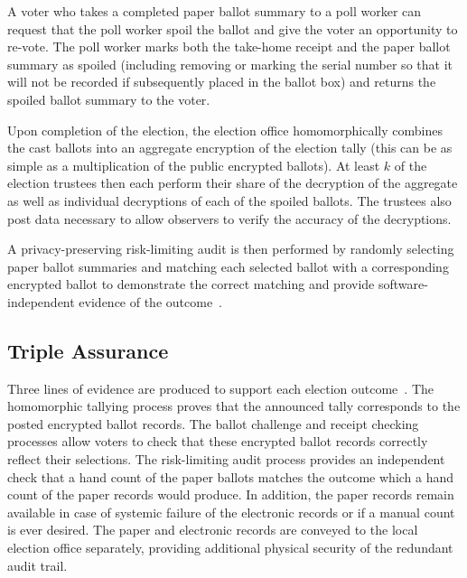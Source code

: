 A voter who takes a completed paper ballot summary to a poll worker can request that the poll worker spoil the ballot and give the voter an opportunity to re-vote.  
The poll worker marks both the take-home receipt and the paper ballot summary as spoiled (including removing or marking the serial number so that it will not be recorded if subsequently placed in the ballot box) and returns the spoiled ballot summary to the voter.

Upon completion of the election, the election office homomorphically combines the cast ballots into an aggregate encryption of the election tally (this can be as simple as a multiplication of the public encrypted ballots).  At least $k$ of the election trustees then each perform their share of the decryption of the aggregate as well as individual decryptions of each of the spoiled ballots.  The trustees also post data necessary to allow observers to verify the accuracy of the decryptions.

A privacy-preserving risk-limiting audit is then performed by randomly selecting paper ballot summaries and matching each selected ballot with a corresponding encrypted ballot to demonstrate the correct matching and provide software-independent evidence of the outcome~\cite{rivest06sivoting,lindemanStark12,starkWagner12}.

\subsection{Triple Assurance}

Three lines of evidence are produced to support each election outcome~\cite{starkWagner12}.  The homomorphic tallying process proves that the announced tally corresponds to the posted encrypted ballot records.  The ballot challenge and receipt checking processes allow voters to check that these encrypted ballot records correctly reflect their selections.  The risk-limiting audit process provides an independent check that a hand count of the paper ballots matches the outcome which a hand count of the paper records would produce.  In addition, the 
paper records remain available in case of systemic failure of the electronic records or 
if a manual count is ever desired.
The paper and electronic records are conveyed to the local election office separately, providing
additional physical security of the redundant audit trail.

